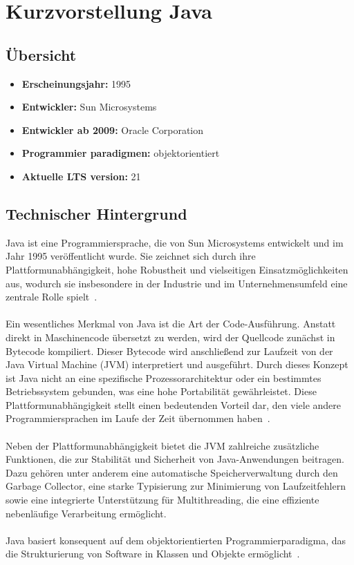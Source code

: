 \documentclass[11pt]{article}
\begin{document}
    \section{Kurzvorstellung Java}

    \subsection{Übersicht}
    \begin{itemize}
        \item \textbf{Erscheinungsjahr:} 1995
        \item \textbf{Entwickler:} Sun Microsystems
        \item \textbf{Entwickler ab 2009:} Oracle Corporation
        \item \textbf{Programmier paradigmen:} objektorientiert
        \item \textbf{Aktuelle LTS version:} 21
    \end{itemize}

    \subsection{Technischer Hintergrund}
    Java ist eine Programmiersprache, die von Sun Microsystems entwickelt und im Jahr 1995 veröffentlicht wurde.
    Sie zeichnet sich durch ihre Plattformunabhängigkeit, hohe Robustheit und vielseitigen Einsatzmöglichkeiten aus, wodurch sie insbesondere in der Industrie und im Unternehmensumfeld eine zentrale Rolle spielt~\cite[55]{insel}.\\
    \\
    Ein wesentliches Merkmal von Java ist die Art der Code-Ausführung.
    Anstatt direkt in Maschinencode übersetzt zu werden, wird der Quellcode zunächst in Bytecode kompiliert.
    Dieser Bytecode wird anschließend zur Laufzeit von der Java Virtual Machine (JVM) interpretiert und ausgeführt.
    Durch dieses Konzept ist Java nicht an eine spezifische Prozessorarchitektur oder ein bestimmtes Betriebssystem gebunden, was eine hohe Portabilität gewährleistet.
    Diese Plattformunabhängigkeit stellt einen bedeutenden Vorteil dar, den viele andere Programmiersprachen im Laufe der Zeit übernommen haben~\cite[52]{insel}.\\
    \\
    Neben der Plattformunabhängigkeit bietet die JVM zahlreiche zusätzliche
    Funktionen, die zur Stabilität und Sicherheit von Java-Anwendungen beitragen.
    Dazu gehören unter anderem eine automatische Speicherverwaltung
    durch den Garbage Collector, eine starke Typisierung zur Minimierung
    von Laufzeitfehlern sowie eine integrierte Unterstützung für Multithreading,
    die eine effiziente nebenläufige Verarbeitung ermöglicht\cite[51 - 55]{insel}.\\
    \\
    Java basiert konsequent auf dem objektorientierten Programmierparadigma, das die Strukturierung von Software in Klassen und Objekte ermöglicht~\cite[54]{insel}. \\
    \\
\end{document}
